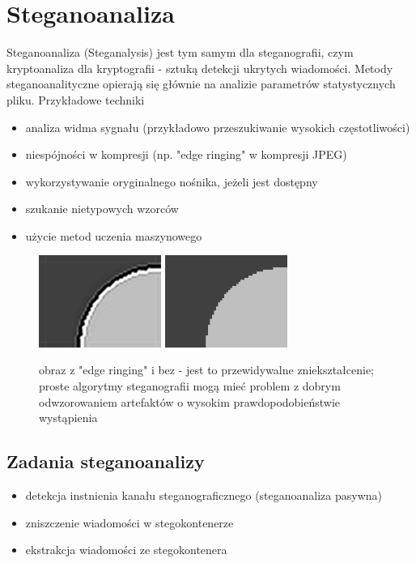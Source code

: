 \documentclass{article}
\begin{document}
\section{Steganoanaliza}
Steganoanaliza (Steganalysis) jest tym samym dla steganografii, czym kryptoanaliza dla kryptografii - sztuką detekcji ukrytych wiadomości.
Metody steganoanalityczne opierają się głównie na analizie parametrów statystycznych pliku. Przykładowe techniki
\begin{itemize}
	\item analiza widma sygnału (przykładowo przeszukiwanie wysokich częstotliwości)
	\item niespójności w kompresji (np. "edge ringing" w kompresji JPEG)
	\item wykorzystywanie oryginalnego nośnika, jeżeli jest dostępny 
	\item szukanie nietypowych wzorców 
	\item użycie metod uczenia maszynowego
\end{itemize}
\begin{figure}[H]
	\centering
	\includegraphics[width=4cm]{edge_ringing}
	\includegraphics[width=4cm]{noringing}
	\caption{obraz z "edge ringing" i bez - jest to przewidywalne zniekształcenie; proste algorytmy steganografii mogą mieć problem z dobrym 
	odwzorowaniem artefaktów o wysokim prawdopodobieństwie wystąpienia}
\end{figure}
\subsection{Zadania steganoanalizy}
\begin{itemize}
	\item detekcja instnienia kanału steganograficznego (steganoanaliza pasywna)
	\item zniszczenie wiadomości w stegokontenerze
	\item ekstrakcja wiadomości ze stegokontenera
\end{itemize}
\end{document}
